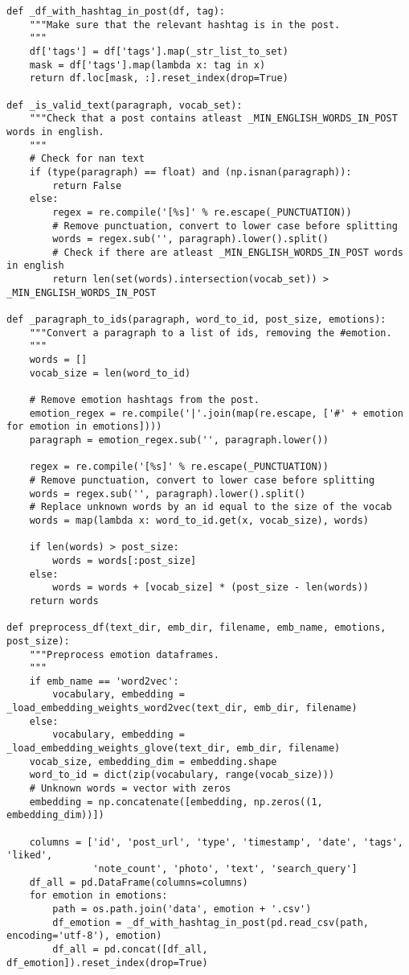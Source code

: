\begin{lstlisting}
def _df_with_hashtag_in_post(df, tag):
    """Make sure that the relevant hashtag is in the post.
    """
    df['tags'] = df['tags'].map(_str_list_to_set)
    mask = df['tags'].map(lambda x: tag in x)
    return df.loc[mask, :].reset_index(drop=True)

def _is_valid_text(paragraph, vocab_set):
    """Check that a post contains atleast _MIN_ENGLISH_WORDS_IN_POST words in english.
    """
    # Check for nan text
    if (type(paragraph) == float) and (np.isnan(paragraph)):
        return False
    else:
        regex = re.compile('[%s]' % re.escape(_PUNCTUATION))
        # Remove punctuation, convert to lower case before splitting
        words = regex.sub('', paragraph).lower().split()
        # Check if there are atleast _MIN_ENGLISH_WORDS_IN_POST words in english
        return len(set(words).intersection(vocab_set)) > _MIN_ENGLISH_WORDS_IN_POST

def _paragraph_to_ids(paragraph, word_to_id, post_size, emotions):
    """Convert a paragraph to a list of ids, removing the #emotion.
    """
    words = []
    vocab_size = len(word_to_id)

    # Remove emotion hashtags from the post.
    emotion_regex = re.compile('|'.join(map(re.escape, ['#' + emotion for emotion in emotions])))
    paragraph = emotion_regex.sub('', paragraph.lower())

    regex = re.compile('[%s]' % re.escape(_PUNCTUATION))
    # Remove punctuation, convert to lower case before splitting
    words = regex.sub('', paragraph).lower().split()
    # Replace unknown words by an id equal to the size of the vocab
    words = map(lambda x: word_to_id.get(x, vocab_size), words)
        
    if len(words) > post_size:
        words = words[:post_size]
    else:
        words = words + [vocab_size] * (post_size - len(words))
    return words

def preprocess_df(text_dir, emb_dir, filename, emb_name, emotions, post_size):
    """Preprocess emotion dataframes.
    """
    if emb_name == 'word2vec':
        vocabulary, embedding = _load_embedding_weights_word2vec(text_dir, emb_dir, filename)
    else:
        vocabulary, embedding = _load_embedding_weights_glove(text_dir, emb_dir, filename)
    vocab_size, embedding_dim = embedding.shape
    word_to_id = dict(zip(vocabulary, range(vocab_size)))
    # Unknown words = vector with zeros
    embedding = np.concatenate([embedding, np.zeros((1, embedding_dim))])

    columns = ['id', 'post_url', 'type', 'timestamp', 'date', 'tags', 'liked',
               'note_count', 'photo', 'text', 'search_query']
    df_all = pd.DataFrame(columns=columns)
    for emotion in emotions:
        path = os.path.join('data', emotion + '.csv')
        df_emotion = _df_with_hashtag_in_post(pd.read_csv(path, encoding='utf-8'), emotion)
        df_all = pd.concat([df_all, df_emotion]).reset_index(drop=True)


\end{lstlisting}
